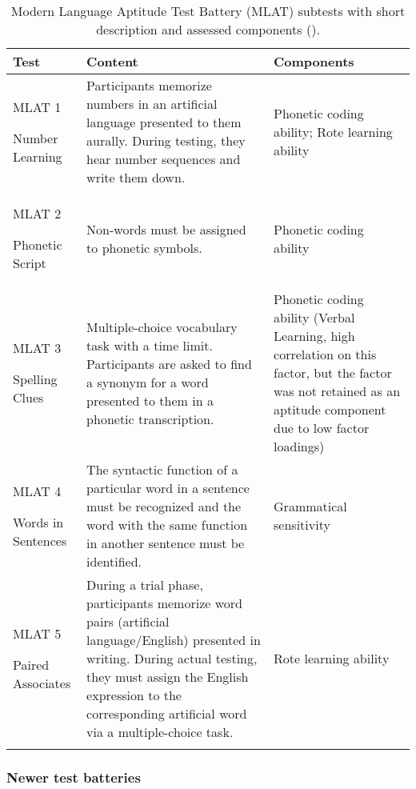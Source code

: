 \documentclass[output=paper]{langscibook}
\begin{document}
\begin{sidewaystable}
\caption{Modern Language Aptitude Test Battery (MLAT) subtests with short description and assessed components (\citealt{CarrollSapon1959}).\label{tab:01:1}}
\begin{tabularx}{\textwidth}{lQQ}
\lsptoprule
Test & Content & Components\\\midrule
{MLAT 1}

{Number Learning} & {Participants memorize numbers in an artificial language presented to them aurally. During testing, they hear number sequences and write them down.} & {Phonetic coding ability; Rote learning ability}\\
{MLAT 2}

{Phonetic Script} & {Non-words must be assigned to phonetic symbols.} & {Phonetic coding ability}\\
{MLAT 3}

{Spelling Clues} & {Multiple-choice vocabulary task with a time limit. Participants are asked to find a synonym for a word presented to them in a phonetic transcription.} & {Phonetic coding ability (Verbal Learning, high correlation on this factor, but the factor was not retained as an aptitude component due to low factor loadings)}\\
{MLAT 4}

{Words in Sentences} & {The syntactic function of a particular word in a sentence must be recognized and the word with the same function in another sentence must be identified.} & {Grammatical sensitivity}\\
{MLAT 5}

{Paired Associates} & {During a trial phase, participants memorize word pairs (artificial language/English) presented in writing. During actual testing, they must assign the English expression to the corresponding artificial word via a multiple-choice task.} & {Rote learning ability}\\
\lspbottomrule
\end{tabularx}
\end{sidewaystable}


\subsubsection{Newer test batteries} %
\end{document}

